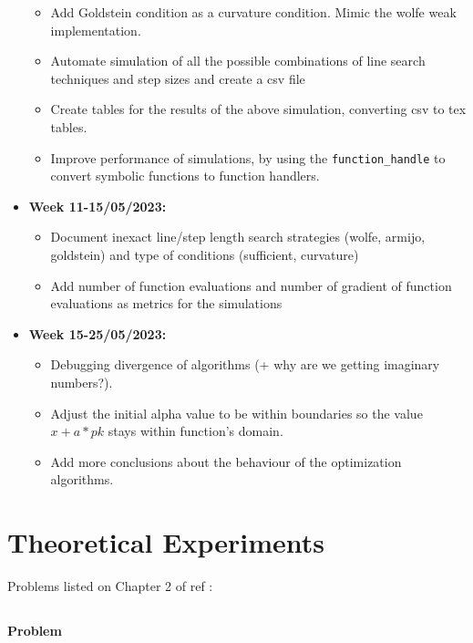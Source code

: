 \documentclass[a4paper,11pt]{article}
\numberwithin{equation}{section} %
\begin{document}
\begin{itemize}
\begin{itemize}
        \item Add Goldstein condition as a curvature condition. Mimic the wolfe weak implementation.
        \item Automate simulation of all the possible combinations of line search techniques and step sizes and create a csv file
        \item Create tables for the results of the above simulation, converting csv to tex tables.
        \item Improve performance of simulations, by using the \verb|function_handle| to convert symbolic functions to function handlers.
    \end{itemize}
    \item \textbf{Week 11-15/05/2023:}
    \begin{itemize}
        \item Document inexact line/step length search strategies (wolfe, armijo, goldstein) and type of conditions (sufficient, curvature)
        \item Add number of function evaluations and number of gradient of function evaluations as metrics for the simulations
    \end{itemize}
    \item \textbf{Week 15-25/05/2023:}
    \begin{itemize}
        \item Debugging divergence of algorithms (+ why are we getting imaginary numbers?).
        \item Adjust the initial alpha value to be within boundaries so the value $x+a*pk$ stays within function's domain.
        \item Add more conclusions about the behaviour of the optimization algorithms.
    \end{itemize}
\end{itemize}
 
\pagebreak

\section{Theoretical Experiments}

Problems listed on Chapter 2 of ref \cite{nocedal1999numerical}:

\label{rosenbrock}
\subsection{}

\textbf{Problem}
\end{document}
